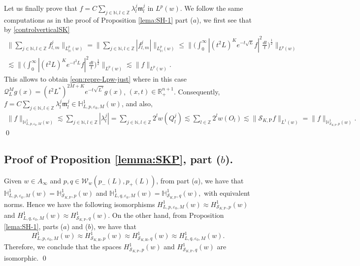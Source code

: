 \documentclass[11pt, a4paper,leqno]{amsart}
\newcommand{\mm}{\mathfrak{m}}
\theoremstyle{plain}
\theoremstyle{definition}
\theoremstyle{remark}
\numberwithin{equation}{section}
\def \N{ \mathbb{N} }
\def \Z{ \mathbb{Z} }
\def \Scal{ \mathcal{S} }
\def \hh{ \mathrm{H} }
\def \pp{ \mathrm{P} }
\begin{document}
Let us finally prove that 
$
f=C\sum_{j\in \N, l\in \Z}\lambda_l^j\mm_l^j\,\, \textrm{in}\,\, L^p(w).
$
We follow the same computations as in the proof of Proposition \ref{lema:SH-1} part ($a$), we first see that by \eqref{controlverticalSK} 
\begin{multline*}
\Bigg\|\sum_{j\in \N, l\in \Z} f_{l,m}^j\Bigg\|_{L_\mathbb{H}^p(w)}
=
\Bigg\|\sum_{j\in \N, l\in \Z} |f_{l,m}^j|\Bigg\|_{L_\mathbb{H}^p(w)}
\le
\Bigg
\|\Big(\int_0^\infty |(t^2L)^Ke^{-t\sqrt{L}}f|^2\frac{dt}{t}\Big)^\frac12\Bigg\|_{L^p(w)}
\\
\lesssim
\Bigg\|\Big(\int_0^\infty |(t^2L)^Ke^{-t^2L}f|^2\frac{dt}{t}\Big)^\frac12\Bigg\|_{L^p(w)}
\lesssim
\|f\|_{L^p(w)}.
\end{multline*}
This allows to obtain 
\eqref{eqn:repre-Lpw-just} where in this case $\mathcal{Q}_L^M g(x)=(t^2L^*)^{2M+K}e^{-t\sqrt{L^*}}g(x)$, $(x,t)\in\mathbb{R}^{n+1}_+$. 
Consequently, $f=C\sum_{j\in \N, l\in \Z}\lambda_l^j\mm_l^j\in \mathbb{H}_{L,p,\varepsilon_0,M}^1(w)$,
and also,
\begin{align*}
\|f\|_{\mathbb{H}_{L,p,\varepsilon_0,M}^1(w)}\lesssim
\sum_{j\in \N, l\in \Z}|\lambda_l^j|=\sum_{j\in \N, l\in \Z}2^lw(Q_l^j)\lesssim \sum_{l\in\Z}2^lw(O_l)\lesssim \|\Scal_{K,\pp}f\|_{L^1(w)}
=\|f\|_{ \mathbb{H}^1_{\Scal_{K,\pp},p}(w)}.
\end{align*}
\qed

\medskip
\subsection{Proof of Proposition \ref{lemma:SKP}, part ($b$).}
Given $w\in A_{\infty}$ and $p,q\in \mathcal{W}_w(p_-(L),p_+(L))$,  from part ($a$), we have that
$
\mathbb{H}_{L,p,\varepsilon_0,M}^1(w)=\mathbb{H}_{\Scal_{K,\pp},p}^1(w)
$ and $
\mathbb{H}_{L,q,\varepsilon_0,M}^1(w)=\mathbb{H}_{\Scal_{K,\pp},q}^1(w),
$
with equivalent norms.
Hence we have the following isomorphisms
$
H_{L,p,\varepsilon_0,M}^1(w)\approx H_{\Scal_{K,\pp},p}^1(w)$ and
$H_{L,q,\varepsilon_0,M}^1(w)\approx H_{\Scal_{K,\pp},q}^1(w).
$
On the other hand, from Proposition \ref{lema:SH-1}, parts ($a$) and ($b$), we have that 
$$
H_{L,p,\varepsilon_0,M}^1(w)\approx H_{\Scal_{K,\hh},p}^1(w)
\approx H_{\Scal_{K,\hh},q}^1(w)\approx
H_{L,q,\varepsilon_0,M}^1(w).
$$
Therefore, we conclude that the spaces $ H_{\Scal_{K,\pp},p}^1(w)$ and 
$ H_{\Scal_{K,\pp},q}^1(w)$ are isomorphic.
\qed
\end{document}

